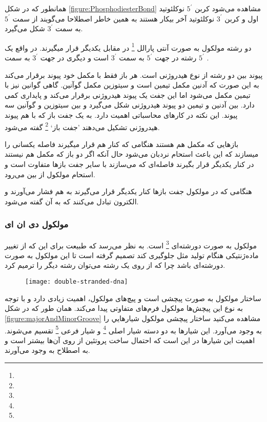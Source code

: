 همانطور که در شکل
\ref{figure:PhosphodiesterBond}
مشاهده می‌شود کربن
$ 5^\prime $
نوکلئوتید اول و کربن
$ 3^\prime $
نوکلئوتید آخر بیکار هستند به همین خاطر اصطلاحا می‌گویند
از سمت
$ 5^\prime $
به سمت
$ 3^\prime $
شکل می‌گیرد.

دو رشته مولکول
به صورت آنتی پارالل
\footnote{}
در مقابل یکدیگر قرار میگیرند. در واقع یک رشته در جهت
$ 5^\prime $
به سمت
$ 3^\prime $
است و دیگری در جهت
$ 3^\prime $
به سمت
$ 5^\prime $
.

پیوند بین دو رشته از نوع هیدروژنی است. هر باز فقط با مکمل خود پیوند برقرار می‌کند به این صورت که آدنین مکمل تیمین است و سیتوزین مکمل گوآنین. گاهی گوانین نیز با تیمین مکمل می‌شود اما این جفت یک پیوند هیدروژنی برقرار می‌کند و پایداری کمی دارد.
بین آدنین و تیمین دو پیوند هیدروژنی شکل می‌گیرد و بین سیتوزین و گوآنین سه پیوند. این نکته در کار‌های محاسباتی اهمیت دارد.
به یک جفت باز که با هم پیوند هیدروژنی تشکیل می‌دهند 'جفت باز` 
\footnote{}
گفته می‌شود.

باز‌هایی که مکمل هم هستند هنگامی که کنار هم قرار میگیرند فاصله یکسانی را میسازند که این باعث استحام نردبان
می‌شود حال آنکه اگر دو باز که مکمل هم نیستند در کنار یکدیگر قرار بگیرند فاصله‌ای که می‌سازند با سایر جفت بازها متفاوت است و استحام مولکول
از بین می‌رود.

هنگامی که در مولکول
جفت بازها کنار یکدیگر قرار می‌گیرند به هم فشار می‌آورند و الکترون تبادل می‌کنند که به آن
گفته می‌شود.

\pagebreak
\subsubsection{مولکول دی ان ای}
مولکول
به صورت دورشته‌ای
\footnote{}
است. به نظر می‌رسد که طبیعت برای این که از تغییر ماده‌ژنتیکی هنگام تولید مثل جلوگیری کند تصمیم گرفته است تا این مولکول به صورت دورشته‌ای باشد چرا که از روی یک رشته می‌توان رشته دیگر را ترمیم کرد.

\begin{figure}[h]
	\centering
	\texttt{[image: double-stranded-dna]}
\end{figure}

ساختار مولکول
به صورت پیچشی است و پیچ‌های مولکول، اهمیت زیادی دارد و با توجه به نوع این پیچش‌ها مولکول فرم‌های متفاوتی پیدا می‌کند.
همان طور که در شکل
\ref{figure:majorAndMinorGroove}
مشاهده می‌کنید ساختار پیچشی مولکول
شیار‌هایي را به وجود می‌آورد. این شیار‌ها به دو دسته شیار اصلی
\footnote{}
و شیار فرعی
\footnote{}
تقسیم می‌شوند. اهمیت این شیارها در این است که احتمال ساخت پروتئین از روی آن‌ها بیشتر است و به اصطلاح
به وجود می‌آورند.

